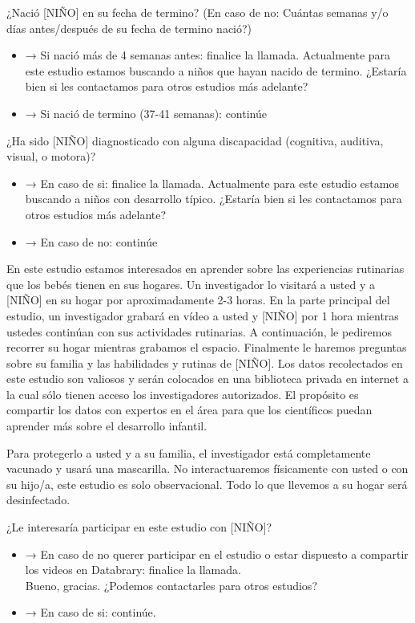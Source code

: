 \documentclass[
]{book}
\providecommand{\tightlist}{%
  \setlength{\itemsep}{0pt}\setlength{\parskip}{0pt}}
\begin{document}
¿Nació {[}NIÑO{]} en su fecha de termino? (En caso de no: Cuántas semanas y/o días antes/después de su fecha de termino nació?)

\begin{itemize}
\tightlist
\item
  → Si nació más de 4 semanas antes: finalice la llamada. Actualmente para este estudio estamos buscando a niños que hayan nacido de termino. ¿Estaría bien si les contactamos para otros estudios más adelante?
\item
  → Si nació de termino (37-41 semanas): continúe
\end{itemize}

¿Ha sido {[}NIÑO{]} diagnosticado con alguna discapacidad (cognitiva, auditiva, visual, o motora)?

\begin{itemize}
\tightlist
\item
  → En caso de si: finalice la llamada. Actualmente para este estudio estamos buscando a niños con desarrollo típico. ¿Estaría bien si les contactamos para otros estudios más adelante?
\item
  → En caso de no: continúe
\end{itemize}

En este estudio estamos interesados en aprender sobre las experiencias rutinarias que los bebés tienen en sus hogares. Un investigador lo visitará a usted y a {[}NIÑO{]} en su hogar por aproximadamente 2-3 horas. En la parte principal del estudio, un investigador grabará en vídeo a usted y {[}NIÑO{]} por 1 hora mientras ustedes continúan con sus actividades rutinarias. A continuación, le pediremos recorrer su hogar mientras grabamos el espacio. Finalmente le haremos preguntas sobre su familia y las habilidades y rutinas de {[}NIÑO{]}. Los datos recolectados en este estudio son valiosos y serán colocados en una biblioteca privada en internet a la cual sólo tienen acceso los investigadores autorizados. El propósito es compartir los datos con expertos en el área para que los científicos puedan aprender más sobre el desarrollo infantil.

Para protegerlo a usted y a su familia, el investigador está completamente vacunado y usará una mascarilla. No interactuaremos físicamente con usted o con su hijo/a, este estudio es solo observacional. Todo lo que llevemos a su hogar será desinfectado.

¿Le interesaría participar en este estudio con {[}NIÑO{]}?

\begin{itemize}
\tightlist
\item
  → En caso de no querer participar en el estudio o estar dispuesto a compartir los videos en Databrary: finalice la llamada.\\
  Bueno, gracias. ¿Podemos contactarles para otros estudios?
\item
  → En caso de si: continúe.
\end{itemize}
\end{document}

